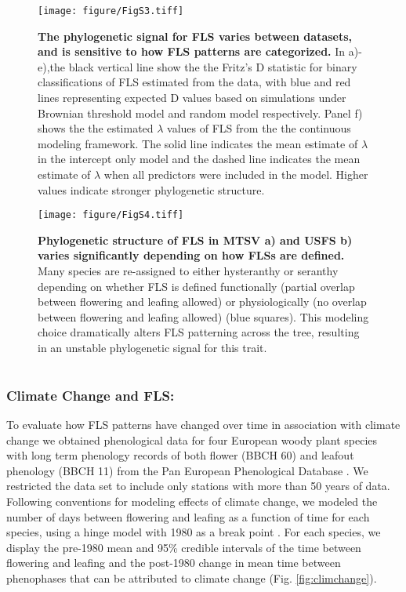 \documentclass[11pt]{article}\usepackage[]{graphicx}\usepackage[]{color}
\begin{document}
\begin{figure}[H]
\centering
\texttt{[image: figure/FigS3.tiff]} 
  \caption{\textbf{The phylogenetic signal for FLS varies between datasets, and is sensitive to how FLS patterns are categorized.} In a)-e),the black vertical line show the the Fritz's D statistic for binary classifications of FLS estimated from the data, with blue and red lines representing expected D values based on simulations under Brownian threshold model and random model respectively. Panel f) shows the the estimated $\lambda$ values of FLS from the the continuous modeling framework. The solid line indicates the mean estimate of $\lambda$ in the intercept only model and the dashed line indicates the mean estimate of $\lambda$ when all predictors were included in the model. Higher values indicate stronger phylogenetic structure.}
    \label{fig:Dstat}
    \end{figure}

\begin{figure}[H]
\centering
\texttt{[image: figure/FigS4.tiff]} 
  \caption{\textbf{Phylogenetic structure of FLS in MTSV \textbf{a)} and USFS \textbf{b)} varies significantly depending on how FLSs are defined.} Many species are re-assigned to either hysteranthy or seranthy depending on whether FLS is defined functionally (partial overlap between flowering and leafing allowed) or physiologically (no overlap between flowering and leafing allowed) (blue squares). This modeling choice dramatically alters FLS patterning across the tree, resulting in an unstable phylogenetic signal for this trait.}
    \label{fig:phylogeny}
    \end{figure}

\pagebreak[4]


\section*{}\label{Methods S1}

\subsubsection*{Climate Change and FLS:}
To evaluate how FLS patterns have changed over time in association with climate change we obtained phenological data for four European woody plant species with long term phenology records of both flower (BBCH 60) and leafout phenology (BBCH 11) from the Pan European Phenological Database \citep{PEP725}. We restricted the data set to include only stations with more than 50 years of data. Following conventions for modeling effects of climate change, we modeled the number of days between flowering and leafing as a function of time for each species, using a hinge model with 1980 as a break point \citep{IPCC2013,Kharouba2018}. For each species, we display the pre-1980 mean and 95\% credible intervals of the time between flowering and leafing and the post-1980 change in mean time between phenophases that can be  attributed to climate change (Fig. \ref{fig:climchange}).
\end{document}
